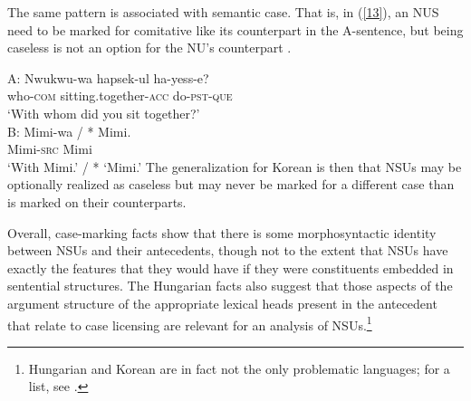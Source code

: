 {%
The same pattern is associated with semantic case. That is, in (\ref{13}), an NUS need
to be marked for comitative like its counterpart in the A-sentence, but being caseless is not an option for the NU's counterpart \citep{Kim2015}.

\ea
A:
\gll Nwukwu-wa          hapsek-ul                     ha-yess-e?\\
     who-\textsc{com}   sitting.together-\textsc{acc} do-\textsc{pst}-\textsc{que}\\
\glt  `With whom did you sit together?'\\

B:
\gll Mimi-wa / * Mimi.\\
     Mimi-\textsc{src} {} {} Mimi\\
\glt `With Mimi.' / * `Mimi.' \label{13}\z
%
The generalization for Korean is then that NSUs may be optionally realized as caseless but may never be marked for a different case than is marked on their counterparts.

Overall, case-marking facts show that there is some morphosyntactic identity between NSUs and their antecedents, though not to the extent that NSUs have exactly the features that they would have if they were constituents embedded in sentential structures. The Hungarian facts also suggest that those aspects of the argument structure of the appropriate lexical heads present in the antecedent that relate to case licensing are relevant for an analysis of NSUs.\footnote{Hungarian and Korean are in fact not the only problematic languages; for a list, see \citet{Vicente2015}.}

}
